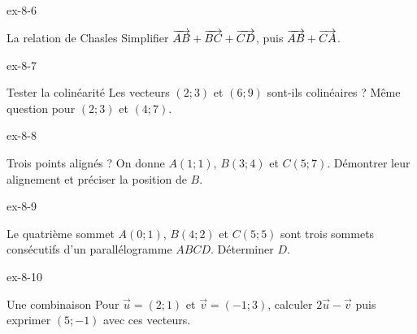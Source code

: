 \clearpage{}
\begin{blocLivre}{ex-8-6}
\begin{exercice}[2]{La relation de Chasles}
Simplifier $\overrightarrow{AB}+\overrightarrow{BC}+\overrightarrow{CD}$, puis $\overrightarrow{AB}+\overrightarrow{CA}$.
\label{fig-ex-8-6}
\end{exercice}
\end{blocLivre}
\begin{blocLivre}{ex-8-7}
\begin{exercice}[2]{Tester la colinéarité}
Les vecteurs $(2;3)$ et $(6;9)$ sont-ils colinéaires ? Même question pour $(2;3)$ et $(4;7)$.
\label{fig-ex-8-7}
\end{exercice}
\end{blocLivre}
\begin{blocLivre}{ex-8-8}
\begin{exercice}[2]{Trois points alignés ?}
On donne $A(1;1)$, $B(3;4)$ et $C(5;7)$. Démontrer leur alignement et préciser la position de $B$.
\label{fig-ex-8-8}
\end{exercice}
\end{blocLivre}
\begin{blocLivre}{ex-8-9}
\begin{exercice}[2]{Le quatrième sommet}
$A(0;1)$, $B(4;2)$ et $C(5;5)$ sont trois sommets consécutifs d’un parallélogramme $ABCD$. Déterminer $D$.
\label{fig-ex-8-9}
\end{exercice}
\end{blocLivre}
\begin{blocLivre}{ex-8-10}
\begin{exercice}[2]{Une combinaison}
Pour $\vec u=(2;1)$ et $\vec v=(-1;3)$, calculer $2\vec u-\vec v$ puis exprimer $(5;-1)$ avec ces vecteurs.
\label{fig-ex-8-10}
\end{exercice}
\end{blocLivre}

